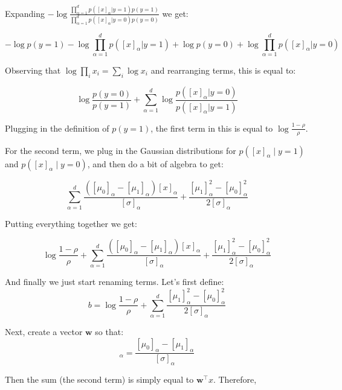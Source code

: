 \documentclass[a4paper]{article}
\begin{document}
Expanding $-\log\frac{\prod_{\alpha=1}^{d} p([x]_{\alpha}|y=1)p(y=1)}{\prod_{\alpha=1}^{d} p([x]_{\alpha}|y=0)p(y=0)}$ we get:

\begin{equation*}
-\log p(y=1) - \log \prod_{\alpha=1}^{d} p([x]_{\alpha}|y=1) + \log p(y=0) + \log \prod_{\alpha=1}^{d} p([x]_{\alpha}|y=0)
\end{equation*}

Observing that $\log \prod_{i} x_{i} = \sum_{i} \log x_{i}$ and rearranging terms, this is equal to:

\begin{equation*}
\log \frac{p(y=0)}{p(y=1)} + \sum_{\alpha=1}^{d} \log \frac{p([x]_{\alpha}|y=0)}{p([x]_{\alpha}|y=1)}
\end{equation*}

Plugging in the definition of $p(y=1)$, the first term in this is equal to $\log \frac{1-\rho}{\rho}$. 

For the second term, we plug in the Gaussian distributions for $p([x]_{\alpha} \mid y=1)$ and $p([x]_{\alpha} \mid y=0)$, and then do a bit of algebra to get:

\begin{equation*}
\sum_{\alpha=1}^{d} \frac{([\mu_{0}]_{\alpha}-[\mu_{1}]_{\alpha})[x]_{\alpha}}{[\sigma]_{\alpha}} + \frac{[\mu_{1}]^{2}_{\alpha}-[\mu_{0}]^{2}_{\alpha}}{2[\sigma]_{\alpha}}
\end{equation*}

Putting everything together we get:

\begin{equation*}
\log \frac{1-\rho}{\rho} + \sum_{\alpha=1}^{d} \frac{([\mu_{0}]_{\alpha}-[\mu_{1}]_{\alpha})[x]_{\alpha}}{[\sigma]_{\alpha}} + \frac{[\mu_{1}]^{2}_{\alpha}-[\mu_{0}]^{2}_{\alpha}}{2[\sigma]_{\alpha}}
\end{equation*}

And finally we just start renaming terms. Let's first define:
\begin{equation*}
b = \log \frac{1-\rho}{\rho} + \sum_{\alpha=1}^{d} \frac{[\mu_{1}]^{2}_{\alpha}-[\mu_{0}]^{2}_{\alpha}}{2[\sigma]_{\alpha}}
\end{equation*}

Next, create a vector $\mathbf{w}$ so that:
\begin{equation*}
[\mathbf{w}]_{\alpha} = \frac{[\mu_{0}]_{\alpha}-[\mu_{1}]_{\alpha}}{[\sigma]_{\alpha}}
\end{equation*}

Then the sum (the second term) is simply equal to $\mathbf{w}^{\top}x$. Therefore,
\end{document}
